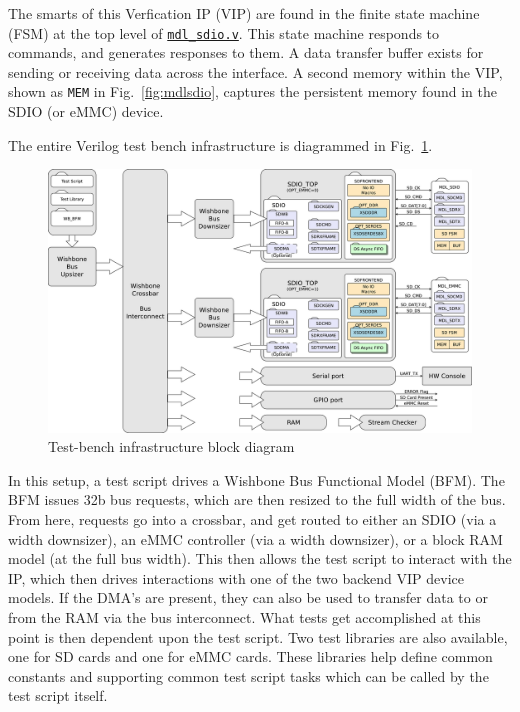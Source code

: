 \documentclass{gqtekspec}
\newcommand{\zhref}[2]{\href{#1}{\textcolor{dkblue}{#2}}}
\begin{document}
The smarts of this Verfication IP (VIP) are found in the finite state machine
(FSM) at the top level of \zhref{../bench/verilog/mdl\_sdio.v}{\tt mdl\_sdio.v}.
This state machine responds to commands, and generates responses to them.  A
data transfer buffer exists for sending or receiving data across the interface.
A second memory within the VIP, shown as {\tt MEM} in Fig.~\ref{fig:mdlsdio},
captures the persistent memory found in the SDIO (or eMMC) device.

The entire Verilog test bench infrastructure is diagrammed in
Fig.~\ref{fig:vlogtb}.
\begin{figure}\begin{center}
\includegraphics[width=5.0in]{gfx/vlogtb.eps}
\caption{Test-bench infrastructure block diagram}\label{fig:vlogtb}
\end{center}\end{figure}
In this setup, a test script drives a Wishbone Bus Functional Model (BFM).
The BFM issues 32b bus requests, which are then resized to the full width
of the bus.  From here, requests go into a crossbar, and get routed to either
an SDIO (via a width downsizer), an eMMC controller (via a width downsizer),
or a block RAM model (at the full bus width).  This then allows the test
script to interact with the IP, which then drives interactions with one of the
two backend VIP device models.  If the DMA's are present, they can also be used
to transfer data to or from the RAM via the bus interconnect.  What tests get
accomplished at this point is then dependent upon the test script.  Two test
libraries are also available, one for SD cards and one for eMMC cards.  These
libraries help define common constants and supporting common test script tasks
which can be called by the test script itself.
\end{document}
